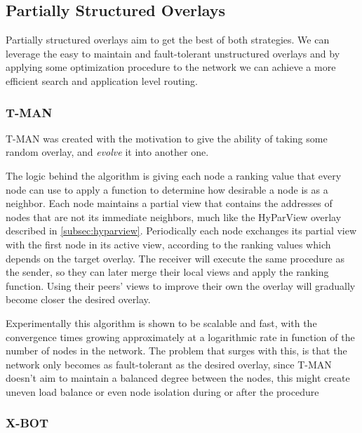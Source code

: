 \subsection{Partially Structured Overlays}
\label{sub:partially_structured_overlays}

Partially structured overlays aim to get the best of both strategies. We can 
leverage the easy to maintain and fault-tolerant unstructured overlays and
by applying some optimization procedure to the network we can achieve a more
efficient search and application level routing.

\subsubsection{T-MAN}
\label{subsec:t-man}

T-MAN \cite{tman} was created with the motivation to give
the ability of taking some random overlay, and \textit{evolve} it into another one.

The logic behind the algorithm is giving each node a ranking value that every node can
use to apply a function to determine how desirable a node is as a neighbor.
Each node maintains a partial view that contains the addresses of nodes that are not its
immediate neighbors, much like the HyParView overlay described in \ref{subsec:hyparview}.
Periodically each node exchanges its partial view with the first node in its active view,
according to the ranking
values which depends on the target overlay. The receiver will execute the same procedure
as the sender, so they can later merge their local views and apply the ranking function.
Using their peers' views to improve their own the overlay will gradually become closer
the desired overlay.

Experimentally this algorithm is shown to be scalable and fast, with the convergence
times growing approximately at a logarithmic rate in function of the number of nodes in
the network. The problem that surges with this, is that the network only becomes as 
fault-tolerant as the desired overlay, since T-MAN doesn't aim to maintain a balanced degree
between the nodes, this might create uneven load balance or even node isolation during
or after the procedure

\subsubsection{X-BOT}
\label{subsec:x-bot}

